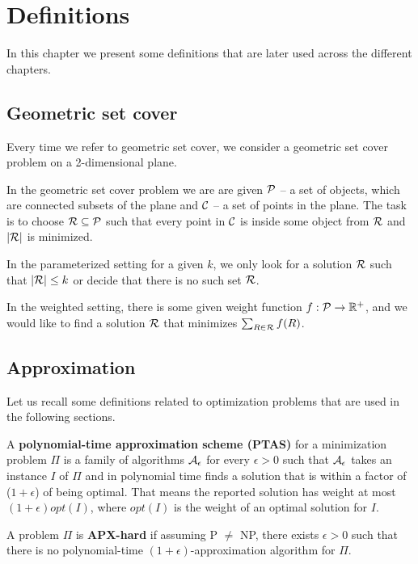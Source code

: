 \chapter{Definitions}

In this chapter we present some definitions that are later used
across the different chapters.

\section{Geometric set cover}
Every time we refer to geometric set cover,
we consider a geometric set cover problem
on a 2-dimensional plane.

In the geometric set cover problem we are are given
$\mathcal{P}$ -- a set of objects, which are connected
subsets of the plane and $\mathcal{C}$ -- a set of points in the plane.
The task is to choose $\mathcal{R} \subseteq \mathcal{P}$ such that
every point in $\mathcal{C}$ is inside some object from $\mathcal{R}$
and $|\mathcal{R}|$ is minimized.

In the parameterized setting for a given $k$,
we only look for a solution $\mathcal{R}$ such that $|\mathcal{R}| \le k$
or decide that there is no such set $\mathcal{R}$.

In the weighted setting, there is some given weight function
$f : \mathcal{P} \rightarrow \mathbb{R^+}$,
and we would like to find a solution $\mathcal{R}$
that minimizes $\sum_{R \in \mathcal{R}} f(R)$.

\section{Approximation}

Let us recall some definitions related to optimization problems
that are used in the following sections.

\begin{defi}
A \textbf{polynomial-time approximation scheme (PTAS)}
for a minimization problem $\Pi$
is a family of algorithms $\cal{A}_\epsilon$ for
every $\epsilon > 0$
such that $\cal{A}_\epsilon$ takes an instance $I$ of $\Pi$
and in polynomial time
finds a solution that is within a factor
of ($1+\epsilon$) of being optimal.
That means the reported solution has weight at most
$(1+\epsilon)opt(I)$, where $opt(I)$ is the weight
of an optimal solution for $I$.
\end{defi}

\begin{defi}
A problem $\Pi$ is \textbf{APX-hard} if assuming P $\neq$ NP,
there exists $\epsilon > 0$
such that there is no polynomial-time $(1+\epsilon)$-approximation algorithm
for $\Pi$.
\end{defi}


